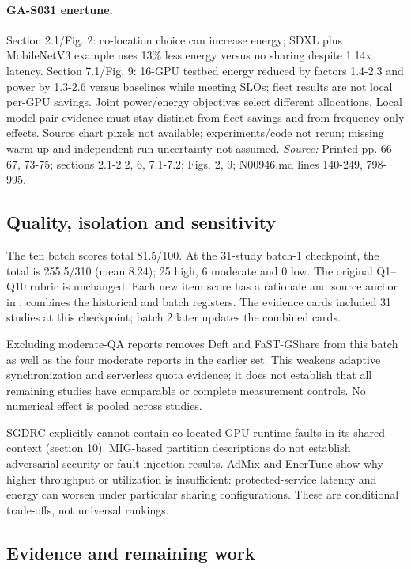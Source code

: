 \paragraph{GA-S031 enertune.} Section 2.1/Fig. 2: co-location choice can increase energy; SDXL plus MobileNetV3 example uses 13\% less energy versus no sharing despite 1.14x latency. Section 7.1/Fig. 9: 16-GPU testbed energy reduced by factors 1.4-2.3 and power by 1.3-2.6 versus baselines while meeting SLOs; fleet results are not local per-GPU savings. Joint power/energy objectives select different allocations. Local model-pair evidence must stay distinct from fleet savings and from frequency-only effects. Source chart pixels not available; experiments/code not rerun; missing warm-up and independent-run uncertainty not assumed. \textit{Source:} Printed pp. 66-67, 73-75; sections 2.1-2.2, 6, 7.1-7.2; Figs. 2, 9; N00946.md lines 140-249, 798-995.

\subsection{Quality, isolation and sensitivity}

The ten batch scores total 81.5/100. At the 31-study batch-1 checkpoint, the total is 255.5/310 (mean 8.24); 25 high, 6 moderate and 0 low. The original Q1--Q10 rubric is unchanged. Each new item score has a rationale and source anchor in ;  combines the historical and batch registers. The evidence cards included 31 studies at this checkpoint; batch 2 later updates the combined cards.

Excluding moderate-QA reports removes Deft and FaST-GShare from this batch as well as the four moderate reports in the earlier set. This weakens adaptive synchronization and serverless quota evidence; it does not establish that all remaining studies have comparable or complete measurement controls. No numerical effect is pooled across studies.

SGDRC explicitly cannot contain co-located GPU runtime faults in its shared context (section 10). MIG-based partition descriptions do not establish adversarial security or fault-injection results. AdMix and EnerTune show why higher throughput or utilization is insufficient: protected-service latency and energy can worsen under particular sharing configurations. These are conditional trade-offs, not universal rankings.

\subsection{Evidence and remaining work}

